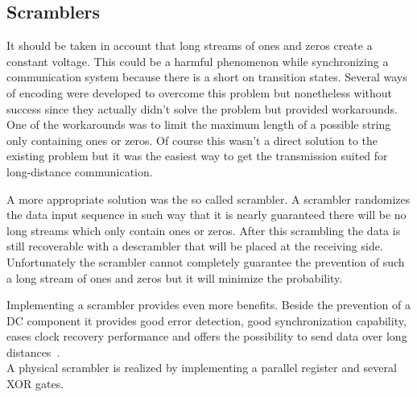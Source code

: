\subsection{Scramblers}
It should be taken in account that long streams of ones and zeros create a constant voltage. This could be a harmful phenomenon while synchronizing a communication system because there is a short on transition states. Several ways of encoding were developed to overcome this problem but nonetheless without success since they actually didn't solve the problem but provided workarounds. One of the workarounds was to limit the maximum length of a possible string only containing ones or zeros. Of course this wasn't a direct solution to the existing problem but it was the easiest way to get the transmission suited for long-distance communication.

A more appropriate solution was the so called scrambler. A scrambler randomizes the data input sequence in such way that it is nearly guaranteed there will be no long streams which only contain ones or zeros. After this scrambling the data is still recoverable with a descrambler that will be placed at the receiving side.\\
Unfortunately the scrambler cannot completely guarantee the prevention of such a long stream of ones and zeros but it will minimize the probability.

Implementing a scrambler provides even more benefits. Beside the prevention of a DC component it provides good error detection, good synchronization capability, eases clock recovery performance and offers the possibility to send data over long distances~\cite{scrambler}. \\
A physical scrambler is realized by implementing a parallel register and several XOR gates.

\newpage
